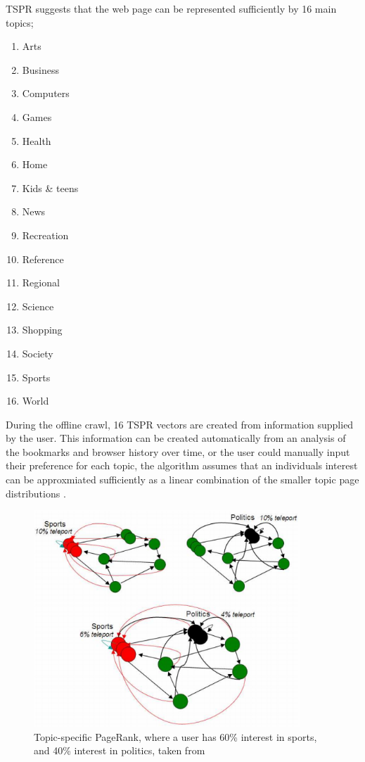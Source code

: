 \documentclass[11pt]{report}
\begin{document}
TSPR suggests that the web page can be represented sufficiently by 16 main topics;
\begin{enumerate}
\item Arts
\item Business
\item Computers
\item Games
\item Health
\item Home
\item Kids \& teens
\item News
\item Recreation
\item Reference
\item Regional
\item Science
\item Shopping
\item Society
\item Sports
\item World
\end{enumerate} During the offline crawl, 16 TSPR vectors are created from information supplied by the user. This information can be created automatically from an analysis of the bookmarks and browser history over time, or the user could manually input their preference for each topic, the algorithm assumes that an individuals interest can be approxmiated sufficiently as a linear combination of the smaller topic page distributions \cite{manning}.
\begin{figure}[h!]
\centering
\includegraphics[width=10cm]{Topic-specific_PageRank_Manning.png}
\caption{Topic-specific PageRank, where a user has 60\% interest in sports, and 40\% interest in politics, taken from \cite{manning}}
\label{fig:topic-specific}
\end{figure}
\end{document}
